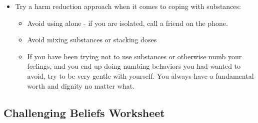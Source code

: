 \documentclass[12pt,letterpaper]{article}
\begin{document}
\begin{itemize}
    \item Try a harm reduction approach when it comes to coping with substances:
    \begin{itemize}
        \item Avoid using alone - if you are isolated, call a friend on the phone.
        \item Avoid mixing substances or stacking doses
        \item If you have been trying not to use substances or otherwise numb your feelings, and you end up doing numbing behaviors you had wanted to avoid, try to be very gentle with yourself.  You always have a fundamental worth and dignity no matter what.
    \end{itemize}
\end{itemize}
\subsection{Challenging Beliefs Worksheet}
\label{challenge}

\end{document}
